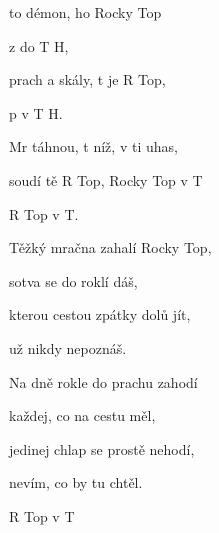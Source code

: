 

\zs
{} to démon,  ho Rocky Top

z do T H,

prach a skály, t je R Top,

p v T H.
\ks

\zr
Mr táhnou, t níž, v ti uhas,

soudí tě R Top, Rocky Top v T

R Top v T.
\kr

\zs
Těžký mračna zahalí Rocky Top,

sotva se do roklí dáš,

kterou cestou zpátky dolů jít,

už nikdy nepoznáš.
\ks

\zr  \kr

\zs
Na dně rokle do prachu zahodí

každej, co na cestu měl,

jedinej chlap se prostě nehodí,

nevím, co by tu chtěl.
\ks

\zr
R Top v T  
\kr


\kp







